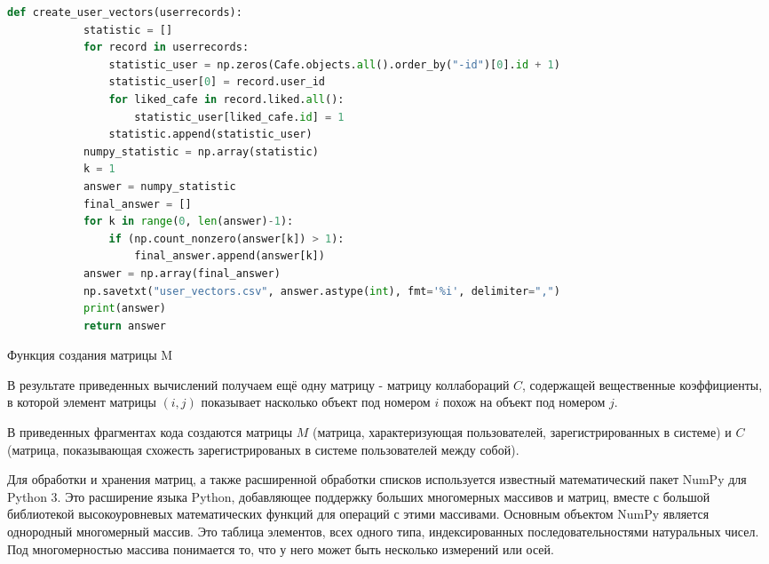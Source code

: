\begin{ListingEnv}[H]%
	\begin{lstlisting}[language=Python]
        def create_user_vectors(userrecords):
            statistic = []
            for record in userrecords:
                statistic_user = np.zeros(Cafe.objects.all().order_by("-id")[0].id + 1)
                statistic_user[0] = record.user_id
                for liked_cafe in record.liked.all():
                    statistic_user[liked_cafe.id] = 1
                statistic.append(statistic_user)
            numpy_statistic = np.array(statistic)
            k = 1
            answer = numpy_statistic
            final_answer = []
            for k in range(0, len(answer)-1):
                if (np.count_nonzero(answer[k]) > 1):
                    final_answer.append(answer[k])
            answer = np.array(final_answer)
            np.savetxt("user_vectors.csv", answer.astype(int), fmt='%i', delimiter=",")
            print(answer)
            return answer
	\end{lstlisting}
\caption{Функция создания матрицы M}
\label{list:hwbeauty}
\end{ListingEnv}

В результате приведенных вычислений получаем ещё одну матрицу - матрицу коллабораций $C$, содержащей вещественные коэффициенты, в которой элемент матрицы $(i,j)$ показывает насколько объект под номером $i$ похож на объект под номером $j$. 

В приведенных фрагментах кода создаются матрицы $M$ (матрица, характеризующая  пользователей, зарегистрированных в системе) и $C$ (матрица, показывающая схожесть зарегистрированых в системе пользователей между собой). 

Для обработки и хранения матриц, а также расширенной обработки списков используется известный математический пакет NumPy для Python 3. Это расширение языка Python, добавляющее поддержку больших многомерных массивов и матриц, вместе с большой библиотекой высокоуровневых математических функций для операций с этими массивами. Основным объектом NumPy является однородный многомерный массив. Это таблица элементов, всех одного типа, индексированных последовательностями натуральных чисел.
Под многомерностью массива понимается то, что у него может быть несколько измерений или осей. 

